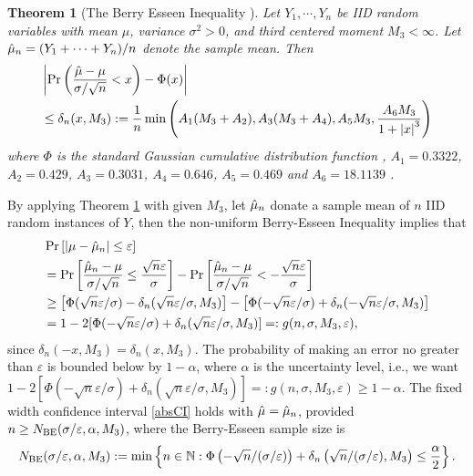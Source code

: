 \documentclass{iitthesis}
\newtheorem{theorem}{Theorem}[section]
\theoremstyle{definition}
\begin{document}

\begin{theorem}[The Berry Esseen Inequality {\cite[Theorem 3]{HJLO12}}]\label{BEThm}
Let $Y_1,\cdots,Y_n$ be IID random variables with mean $\mu$, variance $\sigma^2 >0$, and third centered moment $M_3 < \infty$. Let $\hat{\mu}_n = (Y_1+\cdots+Y_n)/n$ denote the sample mean. Then
\begin{align}
&\left \lvert \Pr\left(\frac{\hat{\mu}-\mu}{\sigma/\sqrt{n}}<x\right)-\Phi(x) \right \rvert \nonumber\\
& \leq \delta_n(x,M_3):=\frac{1}{n}\min\left( A_1(M_3+A_2),  A_3(M_3+A_4), A_5M_3, \frac{A_6M_3}{1+\left \lvert x \right \rvert^3}\right) \label{deltaBEconstant}
\end{align}
where $\Phi$ is the standard Gaussian cumulative distribution function , $A_1 = 0.3322$, $A_2 = 0.429$, $A_3=0.3031$, $A_4=0.646$, $A_5=0.469$ \cite{She13} and $A_6=18.1139$ \cite{NeShe12}.
\end{theorem}
By applying Theorem \ref{BEThm} with given $M_3$, let $\hat{\mu}_n$ donate a sample mean of $n$ IID random instances of $Y$, then the non-uniform Berry-Esseen Inequality implies that
\begin{align} 
&\Pr\left[\left \lvert \mu-\hat{\mu}_n \right \rvert  \le \varepsilon \right]\nonumber\\
&=\Pr\left[\frac{\hat{\mu}_n - \mu}{\sigma/\sqrt{n}} \le \frac{\sqrt{n}\varepsilon}{\sigma} \right]-\Pr\left[\frac{\hat{\mu}_n - \mu}{\sigma/\sqrt{n}} < -\frac{\sqrt{n}\varepsilon}{\sigma}\right] \nonumber \\ 
&\ge \left[\Phi(\sqrt{n}\varepsilon/\sigma)-\delta_n(\sqrt{n}\varepsilon/\sigma,M_3)\right] -\left[\Phi(-\sqrt{n}\varepsilon/\sigma) + \delta_n(-\sqrt{n}\varepsilon/\sigma,M_3)\right] \nonumber \\
&=1-2[\Phi(-\sqrt{n}\varepsilon/\sigma) + \delta_n(\sqrt{n}\varepsilon/\sigma,M_3)] =: g(n, \sigma, M_3, \varepsilon), \label{BEresult}
\end{align}
since $\delta_n(-x,M_3)=\delta_n(x,M_3)$. The probability of
making an error no greater than $\varepsilon$ is bounded below by $1-\alpha$, where $\alpha$ is the uncertainty level, i.e., we want $1-2[\Phi(-\sqrt{n}\varepsilon/\sigma) + \delta_n(\sqrt{n}\varepsilon/\sigma,M_3)] =: g(n, \sigma, M_3, \varepsilon) \geq 1-\alpha$. The fixed width confidence interval \eqref{absCI} holds with $\hat{\mu}=\hat{\mu}_n$, provided $n \ge N_{\text{BE}}(\sigma/\varepsilon,\alpha,M_3)$, where the Berry-Esseen sample size is
\begin{equation}\label{NBE}
N_{\text{BE}}(\sigma/\varepsilon,\alpha,M_3) := \min  \left \{ n \in \mathbb{N} : \Phi\left(-\sqrt{n}/(\sigma /\varepsilon) \right)+\delta_n\left(\sqrt{n}/(\sigma /\varepsilon),M_3\right)
\le \frac{\alpha}{2} \right \}.
\end{equation}
\end{document}
